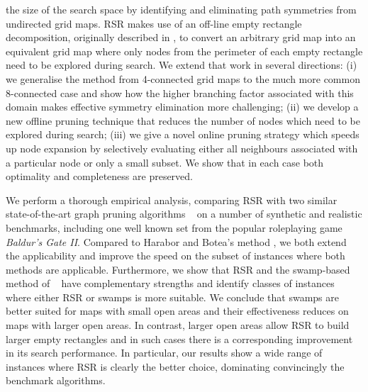 the size of the search space by identifying and eliminating path symmetries from
undirected grid maps.
RSR makes use of an off-line empty rectangle decomposition, originally described in
\cite{harabor10}, to convert an arbitrary grid map into an equivalent grid map where only nodes from the 
perimeter of each empty rectangle need to be explored during search.
We extend that work in several directions: (i) we generalise the method from 4-connected grid maps to 
the much more common 8-connected case and show how the higher branching factor associated 
with this domain makes effective symmetry elimination more challenging;
(ii) we develop a new offline pruning technique that reduces the number of nodes which
need to be explored during search;
(iii) we give a novel online pruning strategy which speeds up node expansion by selectively 
evaluating either all neighbours associated with a particular node or only a small subset.
We show that in each case both optimality and completeness are preserved.
\par
We perform a thorough empirical analysis, comparing RSR with two similar
state-of-the-art graph pruning algorithms ~\cite{pochter10,harabor10}
on a number of synthetic and realistic benchmarks, including one well known set 
from the popular roleplaying game \emph{Baldur's Gate II}.
Compared to Harabor and Botea's method , 
we both extend the applicability and improve the speed
on the subset of instances where both methods are applicable.
Furthermore, we show that RSR and the swamp-based method of 
\citeauthor{pochter10}~
have complementary strengths and identify classes of instances where
either RSR or swamps is more suitable.
We conclude that swamps are better suited for maps with
small open areas and their effectiveness reduces on maps with larger open areas.
In contrast, larger open areas allow RSR to build larger empty rectangles and in such
cases there is a corresponding improvement in its search performance.
In particular, our results show a wide range of instances where
RSR is clearly the better choice, dominating convincingly the benchmark algorithms.

